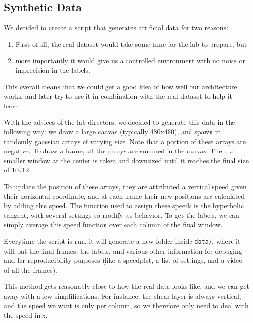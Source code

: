 \documentclass[10pt,conference]{IEEEtran}
\begin{document}
\subsection{Synthetic Data}
We decided to create a script that generates artificial data for two reasons: 
\begin{enumerate}
  \item First of all, the real dataset would take some time for the lab to prepare, but
  \item more importantly it would give us a controlled environment with no noise or imprecision in the labels.
\end{enumerate}
This overall means that we could get a good idea of how well our architecture works, and later try to use it in combination with the real dataset to help it learn.\par
With the advices of the lab directors, we decided to generate this data in the following way: we draw a large canvas (typically 480x480), and spawn in randomly gaussian arrays of varying size. Note that a portion of these arrays are negative. To draw a frame, all the arrays are summed in the canvas. Then, a smaller window at the center is taken and downsized until it reaches the final size of 10x12.\par
To update the position of these arrays, they are attributed a vertical speed given their horizontal coordinate, and at each frame their new positions are calculated by adding this speed. The function used to assign these speeds is the hyperbolic tangent, with several settings to modify its behavior. To get the labels, we can simply average this speed function over each column of the final window.\par
Everytime the script is run, it will generate a new folder inside \texttt{data/}, where it will put the final frames, the labels, and various other information for debuging and for reproducibility purposes (like a speedplot, a list of settings, and a video of all the frames).

This method gets reasonably close to how the real data looks like, and we can get away with a few simplifications. For instance, the shear layer is always vertical, and the speed we want is only per column, so we therefore only need to deal with the speed in $z$.
\end{document}
